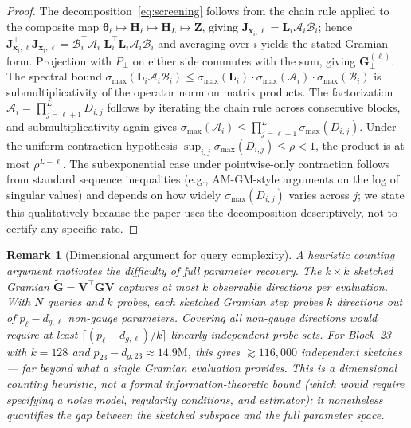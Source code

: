 \documentclass{article}
\newtheorem{remark}[theorem]{Remark}
\newcommand{\btheta}{\boldsymbol{\theta}}
\newcommand{\bx}{\mathbf{x}}
\newcommand{\bJ}{\mathbf{J}}
\newcommand{\bG}{\mathbf{G}}
\newcommand{\bV}{\mathbf{V}}
\newcommand{\bH}{\mathbf{H}}
\newcommand{\bZ}{\mathbf{Z}}
\newcommand{\bL}{\mathbf{L}}
\newcommand{\cA}{\mathcal{A}}
\newcommand{\cB}{\mathcal{B}}
\begin{document}
\begin{proof}
The decomposition~\eqref{eq:screening} follows from the chain rule applied to the composite map $\btheta_\ell \mapsto \bH_\ell \mapsto \bH_L \mapsto \bZ$, giving $\bJ_{\bx_i,\ell} = \bL_i \cA_i \cB_i$; hence $\bJ_{\bx_i,\ell}^\top \bJ_{\bx_i,\ell} = \cB_i^\top \cA_i^\top \bL_i^\top \bL_i \cA_i \cB_i$ and averaging over $i$ yields the stated Gramian form.  Projection with $P_\perp$ on either side commutes with the sum, giving $\bG_\perp^{(\ell)}$.  The spectral bound $\sigma_{\max}(\bL_i \cA_i \cB_i) \leq \sigma_{\max}(\bL_i) \cdot \sigma_{\max}(\cA_i) \cdot \sigma_{\max}(\cB_i)$ is submultiplicativity of the operator norm on matrix products.  The factorization $\cA_i = \prod_{j=\ell+1}^{L} D_{i,j}$ follows by iterating the chain rule across consecutive blocks, and submultiplicativity again gives $\sigma_{\max}(\cA_i) \leq \prod_{j=\ell+1}^{L} \sigma_{\max}(D_{i,j})$.  Under the uniform contraction hypothesis $\sup_{i,j} \sigma_{\max}(D_{i,j}) \leq \rho < 1$, the product is at most $\rho^{L-\ell}$.  The subexponential case under pointwise-only contraction follows from standard sequence inequalities (e.g., AM-GM-style arguments on the log of singular values) and depends on how widely $\sigma_{\max}(D_{i,j})$ varies across $j$; we state this qualitatively because the paper uses the decomposition descriptively, not to certify any specific rate.
\end{proof}

\begin{remark}[Dimensional argument for query complexity]
\label{rem:fisher}
A heuristic counting argument motivates the difficulty of full parameter recovery.  The $k \times k$ sketched Gramian $\tilde{\bG} = \bV^\top \bG \bV$ captures at most $k$ observable directions per evaluation.  With $N$ queries and $k$ probes, each sketched Gramian step probes $k$ directions out of $p_\ell - d_{g,\ell}$ non-gauge parameters.  Covering all non-gauge directions would require at least $\lceil(p_\ell - d_{g,\ell})/k\rceil$ linearly independent probe sets.  For Block~23 with $k = 128$ and $p_{23} - d_{g,23} \approx 14.9\text{M}$, this gives $\gtrsim 116{,}000$ independent sketches --- far beyond what a single Gramian evaluation provides.  This is a dimensional counting heuristic, not a formal information-theoretic bound (which would require specifying a noise model, regularity conditions, and estimator); it nonetheless quantifies the gap between the sketched subspace and the full parameter space.
\end{remark}
\end{document}
